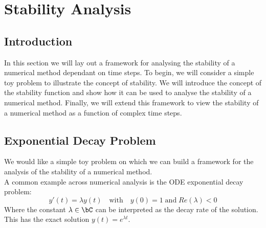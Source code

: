 \section{Stability Analysis}

\subsection{Introduction}
In this section we will lay out a framework for analysing the stability of a numerical method dependant on time steps.
To begin, we will consider a simple toy problem to illustrate the concept of stability.
We will introduce the concept of the stability function and show how it can be used to analyse the stability of a numerical method.
Finally, we will extend this framework to view the stability of a numerical method as a function of complex time steps.



\subsection{Exponential Decay Problem}

\par We would like a simple toy problem on which we can build a framework for the analysis of the stability of a numerical method.\\
A common example across numerical analysis is the ODE exponential decay problem: 
\[y'(t) = \lambda y(t) \quad \text{with} \quad y(0) = 1 \;\text{and}\; Re(\lambda) < 0\]
Where the constant $\lambda \in \bC$ can be interpreted as the decay rate of the solution.\\
This has the exact solution $y(t) = e^{\lambda t}$.\\

